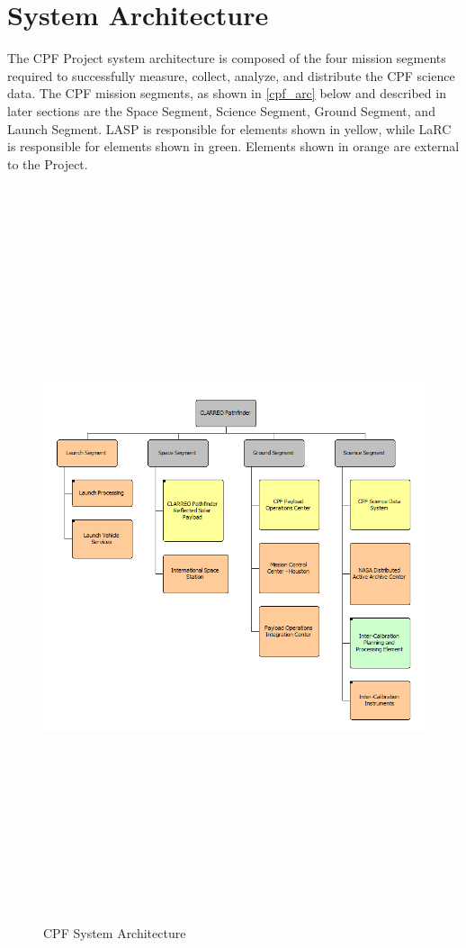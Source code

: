 \section{System Architecture }
\label{systemarchitecture}

The \gls{CPF} Project system architecture is composed of the four mission segments required to successfully \gls{measure}, \gls{collect}, analyze, and distribute the \gls{CPF} science data. The \gls{CPF} mission segments, as shown in \autoref{cpf_arc} below and described in later sections are the Space Segment, Science Segment, Ground Segment, and Launch Segment. \gls{LASP} is responsible for elements shown in yellow, while \gls{LaRC} is responsible for elements shown in green. Elements shown in orange are external to the Project.

\begin{figure}[htbp]
\centering
\includegraphics[keepaspectratio,width=\textwidth,height=8.5in]{20180416_cpf_architecture_l1-3.png}
\caption{\gls{CPF} System Architecture}
\label{cpf_arc}
\end{figure}

